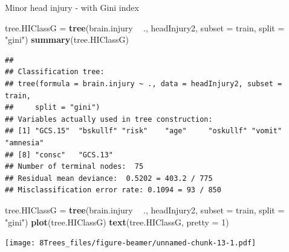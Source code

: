 \documentclass[10pt,ignorenonframetext,]{beamer}
\newenvironment{Shaded}{\begin{snugshade}}{\end{snugshade}}
\newcommand{\KeywordTok}[1]{\textcolor[rgb]{0.13,0.29,0.53}{\textbf{#1}}}
\newcommand{\DataTypeTok}[1]{\textcolor[rgb]{0.13,0.29,0.53}{#1}}
\newcommand{\DecValTok}[1]{\textcolor[rgb]{0.00,0.00,0.81}{#1}}
\newcommand{\StringTok}[1]{\textcolor[rgb]{0.31,0.60,0.02}{#1}}
\newcommand{\OperatorTok}[1]{\textcolor[rgb]{0.81,0.36,0.00}{\textbf{#1}}}
\newcommand{\NormalTok}[1]{#1}
\begin{document}
\begin{frame}[fragile]

\begin{block}{Minor head injury - with Gini index}

\footnotesize

\begin{Shaded}
\begin{Highlighting}[]
\NormalTok{tree.HIClassG =}\StringTok{ }\KeywordTok{tree}\NormalTok{(brain.injury }\OperatorTok{~}\StringTok{ }\NormalTok{., headInjury2, }\DataTypeTok{subset =}\NormalTok{ train, }\DataTypeTok{split =} \StringTok{"gini"}\NormalTok{)}
\KeywordTok{summary}\NormalTok{(tree.HIClassG)}
\end{Highlighting}
\end{Shaded}

\begin{verbatim}
## 
## Classification tree:
## tree(formula = brain.injury ~ ., data = headInjury2, subset = train, 
##     split = "gini")
## Variables actually used in tree construction:
## [1] "GCS.15"  "bskullf" "risk"    "age"     "oskullf" "vomit"   "amnesia"
## [8] "consc"   "GCS.13" 
## Number of terminal nodes:  75 
## Residual mean deviance:  0.5202 = 403.2 / 775 
## Misclassification error rate: 0.1094 = 93 / 850
\end{verbatim}

\normalsize

\end{block}

\end{frame}

\begin{frame}[fragile]

\begin{Shaded}
\begin{Highlighting}[]
\NormalTok{tree.HIClassG =}\StringTok{ }\KeywordTok{tree}\NormalTok{(brain.injury }\OperatorTok{~}\StringTok{ }\NormalTok{., headInjury2, }\DataTypeTok{subset =}\NormalTok{ train, }\DataTypeTok{split =} \StringTok{"gini"}\NormalTok{)}
\KeywordTok{plot}\NormalTok{(tree.HIClassG)}
\KeywordTok{text}\NormalTok{(tree.HIClassG, }\DataTypeTok{pretty =} \DecValTok{1}\NormalTok{)}
\end{Highlighting}
\end{Shaded}

\texttt{[image: 8Trees\_files/figure-beamer/unnamed-chunk-13-1.pdf]}

\end{frame}
\end{document}
